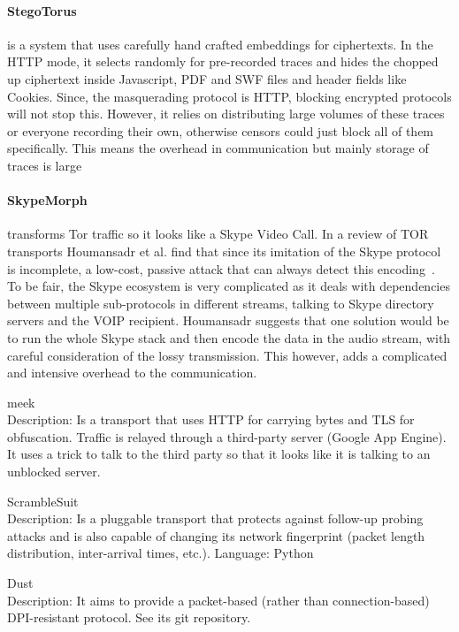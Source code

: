 \documentclass[ %
                    author={Samuel Russell},
                supervisor={Prof. Bogdan Warinschi},
                    degree={MEng},
                     title={Innocuous Ciphertexts},
                  subtitle={The DE-CENSOR Scheme},
                      type={research},
                      year={2018} ]{dissertation}
\begin{document}
\paragraph{StegoTorus} is a system that uses carefully hand crafted embeddings for ciphertexts. In the HTTP mode, it selects randomly for pre-recorded traces and hides the chopped up ciphertext inside Javascript, PDF and SWF files and header fields like Cookies. Since, the masquerading protocol is HTTP, blocking encrypted protocols will not stop this. However, it relies on distributing large volumes of these traces or everyone recording their own, otherwise censors could just block all of them specifically. This means the overhead in communication but mainly storage of traces is large 

\paragraph{SkypeMorph} transforms Tor traffic so it looks like a Skype Video Call.
In a review of TOR transports Houmansadr et al. find that since its imitation of the Skype protocol is incomplete, a low-cost, passive attack that can always detect this encoding~\cite{parot}.
To be fair, the Skype ecosystem is very complicated as it deals with dependencies between multiple sub-protocols in different streams, talking to Skype directory servers and the VOIP recipient. Houmansadr suggests that one solution would be to run the whole Skype stack and then encode the data in the audio stream, with careful consideration of the lossy transmission. This however, adds a complicated and intensive overhead to the communication. 

meek\\
Description: Is a transport that uses HTTP for carrying bytes and TLS for obfuscation. Traffic is relayed through a third-party server (Google App Engine). It uses a trick to talk to the third party so that it looks like it is talking to an unblocked server.

ScrambleSuit\\
Description: Is a pluggable transport that protects against follow-up probing attacks and is also capable of changing its network fingerprint (packet length distribution, inter-arrival times, etc.).
Language: Python



Dust\\
Description: It aims to provide a packet-based (rather than connection-based) DPI-resistant protocol. See its git repository.
\end{document}
